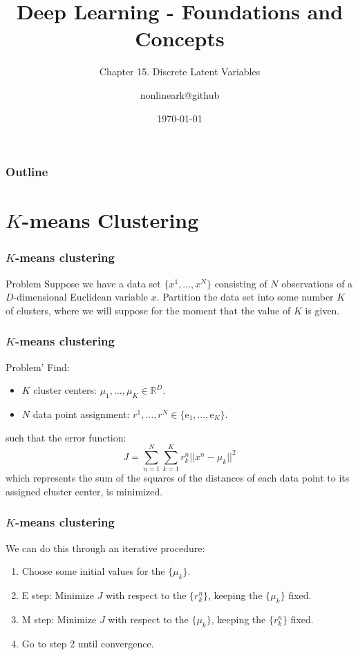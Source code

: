 \documentclass{beamer}
\title{Deep Learning - Foundations and Concepts}
\subtitle{Chapter 15. Discrete Latent Variables}
\author{nonlineark@github}
\date{\today}
\begin{document}
\begin{frame}
    \titlepage
\end{frame}

\begin{frame}
    \frametitle{Outline}
    \tableofcontents
\end{frame}

\section{\texorpdfstring{$K$}{K}-means Clustering}

\begin{frame}
    \frametitle{$K$-means clustering}
    \begin{block}{Problem}
        Suppose we have a data set $\{x^{1},\hdots,x^{N}\}$ consisting of $N$ observations of a $D$-dimensional Euclidean variable $x$. Partition the data set into some number $K$ of clusters, where we will suppose for the moment that the value of $K$ is given.
    \end{block}
\end{frame}

\begin{frame}
    \frametitle{$K$-means clustering}
    \begin{block}{Problem'}
        Find:
        \begin{itemize}
            \item $K$ cluster centers: $\mu_{1},\hdots,\mu_{K}\in\mathbb{R}^{D}$.
            \item $N$ data point assignment: $r^{1},\hdots,r^{N}\in\{\mathrm{e}_{1},\hdots,\mathrm{e}_{K}\}$.
        \end{itemize}
        such that the error function:
        \begin{equation*}
            J=\sum_{n=1}^{N}\sum_{k=1}^{K}r^{n}_{k}||x^{n}-\mu_{k}||^{2}
        \end{equation*}
        which represents the sum of the squares of the distances of each data point to its assigned cluster center, is minimized.
    \end{block}
\end{frame}

\begin{frame}
    \frametitle{$K$-means clustering}
    We can do this through an iterative procedure:
    \begin{enumerate}
        \item Choose some initial values for the $\{\mu_{k}\}$.
        \item E step: Minimize $J$ with respect to the $\{r^{n}_{k}\}$, keeping the $\{\mu_{k}\}$ fixed.
        \item M step: Minimize $J$ with respect to the $\{\mu_{k}\}$, keeping the $\{r^{n}_{k}\}$ fixed.
        \item Go to step 2 until convergence.
    \end{enumerate}
\end{frame}
\end{document}
